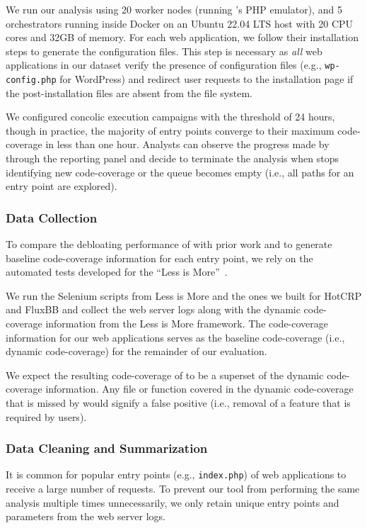 We run our analysis using 20 worker nodes (running \animatedead{}'s PHP emulator), and 5 orchestrators running inside Docker on an Ubuntu 22.04 LTS host with 20 CPU cores and 32GB of memory. 
For each web application, we follow their installation steps to generate the configuration files. 
This step is necessary as \emph{all} web applications in our dataset verify the presence of configuration files (e.g., \texttt{wp-config.php} for WordPress) and redirect user requests to the installation page if the post-installation files are absent from the file system. 

We configured concolic execution campaigns with the threshold of 24 hours, though in practice, the majority of entry points converge to their maximum code-coverage in less than one hour. 
Analysts can observe the progress made by \animatedead{} through the reporting panel and decide to terminate the analysis when \animatedead{} stops identifying new code-coverage or the queue becomes empty (i.e., all paths for an entry point are explored). 

\subsubsection*{Data Collection} 
To compare the debloating performance of \animatedead{} with prior work and to generate baseline code-coverage information for each entry point, we rely on the automated tests developed for the ``Less is More''~\cite{azad2019less}. 

We run the Selenium scripts from Less is More and the ones we built for HotCRP and FluxBB and collect the web server logs along with the dynamic code-coverage information from the Less is More framework. 
The code-coverage information for our web applications serves as the baseline code-coverage (i.e., dynamic code-coverage) for the remainder of our evaluation. 

We expect the resulting code-coverage of \animatedead{} to be a superset of the dynamic code-coverage information. 
Any file or function covered in the dynamic code-coverage that is missed by \animatedead{} would signify a false positive (i.e., removal of a feature that is required by users). 

\subsubsection*{Data Cleaning and Summarization} 
It is common for popular entry points (e.g., \texttt{index.php}) of web applications to receive a large number of requests. 
To prevent our tool from performing the same analysis multiple times unnecessarily, we only retain unique entry points and parameters from the web server logs. 

